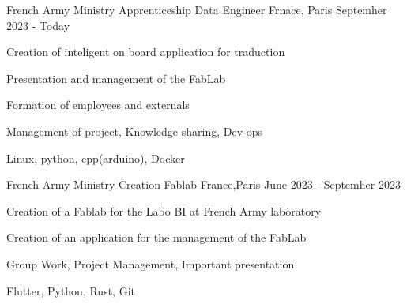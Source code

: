 

\begin{cventries}

  \cventry
    {French Army Ministry} %
    {Apprenticeship Data Engineer} %
    {Frnace, Paris} %
    {Septemher 2023 - Today} %
    {
      \begin{cvitems} %
        \item {Creation of inteligent on board application for traduction}
        \item {Presentation and management of the FabLab}
        \item {Formation of employees and externals}
      \end{cvitems}
    }
    {
      \begin{cvitemsskills} %
        \item {Management of project, Knowledge sharing, Dev-ops}
        \item {Linux, python, cpp(arduino), Docker }
      \end{cvitemsskills}
    }

  \cventry
    {French Army Ministry} %
    {Creation Fablab} %
    {France,Paris} %
    {June 2023 - Septemher 2023} %
    {
      \begin{cvitems} %
        \item {Creation of a Fablab for the Labo BI at French Army laboratory}
        \item {Creation of an application for the management of the FabLab}
      \end{cvitems}
    }
    {
      \begin{cvitemsskills} %
        \item {Group Work, Project Management, Important presentation}
        \item {Flutter, Python, Rust, Git }
      \end{cvitemsskills}
    }


\end{cventries}
